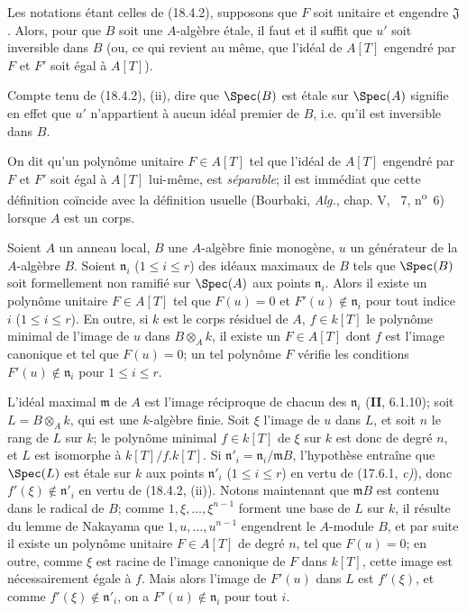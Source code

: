 \begin{corollary}[18.4.3]
Les notations étant celles de \textup{(18.4.2)}, supposons que $F$ soit unitaire et engendre $\mathfrak J$. Alors, pour que $B$ soit une $A$-algèbre étale, il faut et il suffit que $u'$ soit inversible dans $B$ \textup{(ou, ce qui revient au même, que l'idéal de $A[T]$ engendré par $F$ et $F'$ soit égal à $A[T]$)}.
\end{corollary}

Compte tenu de (18.4.2), (ii), dire que $\Spec(B)$ est étale sur $\Spec(A)$ signifie en effet que $u'$ n'appartient à aucun idéal premier de $B$, i.e. qu'il est inversible dans $B$.

On dit qu'un polynôme unitaire $F\in A[T]$ tel que l'idéal de $A[T]$ engendré par $F$ et $F'$ soit égal à $A[T]$ lui-même, est \emph{séparable}; il est immédiat que cette définition coïncide avec la définition usuelle (Bourbaki, \emph{Alg.}, chap. V, \textsection~7, n\textsuperscript{o}~6) lorsque $A$ est un corps.

\begin{lemma}[18.4.4]
\label{IV.18.4.4}
Soient $A$ un anneau local, $B$ une $A$-algèbre finie monogène, $u$ un générateur de la $A$-algèbre $B$. Soient $\mathfrak n_i$ \textup{(}$1\leq i\leq r$\textup{)} des idéaux maximaux de $B$ tels que $\Spec(B)$ soit formellement non ramifié sur $\Spec(A)$ aux points $\mathfrak n_i$. Alors il existe un polynôme unitaire $F\in A[T]$ tel que $F(u)=0$ et $F'(u)\notin\mathfrak n_i$ pour tout indice $i$ \textup{(}$1\leq i\leq r$\textup{)}. En outre, si $k$ est le corps
résiduel de $A$, $f\in k[T]$ le polynôme minimal de l'image de $u$ dans $B\otimes_A k$, il existe un $F\in A[T]$ dont $f$ est l'image canonique et tel que $F(u)=0$; un tel polynôme $F$ vérifie les conditions $F'(u)\notin\mathfrak n_i$ pour $1\leq i\leq r$.
\end{lemma}

L'idéal maximal $\mathfrak m$ de $A$ est l'image réciproque de chacun des $\mathfrak n_i$ (\textbf{II}, 6.1.10); soit $L=B\otimes_A k$, qui est une $k$-algèbre finie. Soit $\xi$ l'image de $u$ dans $L$, et soit $n$ le rang de $L$ sur $k$; le polynôme minimal $f\in k[T]$ de $\xi$ sur $k$ est donc de degré $n$, et $L$ est isomorphe à $k[T]/f.k[T]$. Si $\mathfrak n'_i=\mathfrak n_i/\mathfrak mB$, l'hypothèse entraîne que $\Spec(L)$ est étale sur $k$ aux points $\mathfrak n'_i$ ($1\leq i\leq r$) en vertu de (17.6.1, \emph{c)}), donc $f'(\xi)\notin\mathfrak n'_i$ en vertu de (18.4.2, (ii)). Notons maintenant que $\mathfrak mB$ est contenu dans le radical de $B$; comme $1,\xi,\ldots,\xi^{n-1}$ forment une base de $L$ sur $k$, il résulte du lemme de Nakayama que $1,u,\ldots,u^{n-1}$ engendrent le $A$-module $B$, et par suite il existe un polynôme unitaire $F\in A[T]$ de degré $n$, tel que $F(u)=0$; en outre, comme $\xi$ est racine de l'image canonique de $F$ dans $k[T]$, cette image est nécessairement égale à $f$. Mais alors l'image de $F'(u)$ dans $L$ est $f'(\xi)$, et comme $f'(\xi)\notin\mathfrak n'_i$, on a $F'(u)\notin\mathfrak n_i$ pour tout $i$.


